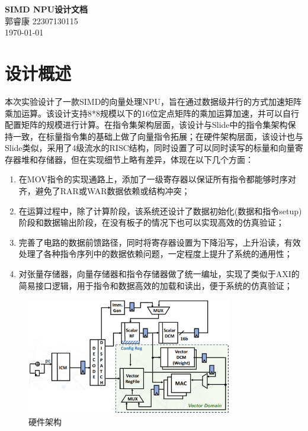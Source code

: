 \documentclass{article}
\begin{document}
\begin{titlepage}
    \centering
    \vspace*{\fill}
    {\LARGE\bfseries SIMD NPU设计文档}\\[1.5cm]
    {\Large 郭睿康 22307130115}\\[0.5cm]
    {\Large \today}
    \vspace*{\fill}
\end{titlepage}

\newpage

\section{设计概述}
本次实验设计了一款SIMD的向量处理NPU，旨在通过数据级并行的方式加速矩阵乘加运算。该设计支持8*8规模以下的16位定点矩阵的乘加运算加速，并可以自行配置矩阵的规模进行计算。在指令集架构层面，该设计与Slide中的指令集架构保持一致，在标量指令集的基础上做了向量指令拓展；在硬件架构层面，该设计也与Slide类似，采用了4级流水的RISC结构，同时设置了可以同时读写的标量和向量寄存器堆和存储器，但在实现细节上略有差异，体现在以下几个方面：
\begin{enumerate}
    \item 在MOV指令的实现通路上，添加了一级寄存器以保证所有指令都能够时序对齐，避免了RAR或WAR数据依赖或结构冲突；
    \item 在运算过程中，除了计算阶段，该系统还设计了数据初始化(数据和指令setup)阶段和数据输出阶段，在没有板子的情况下也可以实现高效的仿真验证；
    \item 完善了电路的数据前馈路径，同时将寄存器设置为下降沿写，上升沿读，有效处理了各种指令序列中的数据依赖问题，一定程度上提升了系统的通用性；
    \item 对张量存储器，向量存储器和指令存储器做了统一编址，实现了类似于AXI的简易接口逻辑，用于指令和数据高效的加载和读出，便于系统的仿真验证；
\end{enumerate}
\begin{figure}[!ht]
    \centering
    \includegraphics[width=0.8\textwidth]{Arch.png}
    \caption{硬件架构}
\end{figure}
\end{document}
